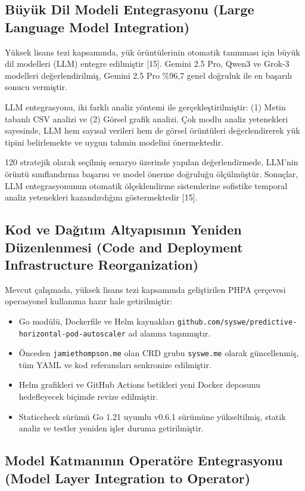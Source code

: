 \documentclass[12pt,a4paper]{article}
\begin{document}
\subsection{Büyük Dil Modeli Entegrasyonu (Large Language Model Integration)}

Yüksek lisans tezi kapsamında, yük örüntülerinin otomatik tanınması için büyük dil modelleri (LLM) entegre edilmiştir [15]. Gemini 2.5 Pro, Qwen3 ve Grok-3 modelleri değerlendirilmiş, Gemini 2.5 Pro \%96,7 genel doğruluk ile en başarılı sonucu vermiştir.

LLM entegrasyonu, iki farklı analiz yöntemi ile gerçekleştirilmiştir: (1) Metin tabanlı CSV analizi ve (2) Görsel grafik analizi. Çok modlu analiz yetenekleri sayesinde, LLM hem sayısal verileri hem de görsel örüntüleri değerlendirerek yük tipini belirlemekte ve uygun tahmin modelini önermektedir.

120 stratejik olarak seçilmiş senaryo üzerinde yapılan değerlendirmede, LLM'nin örüntü sınıflandırma başarısı ve model önerme doğruluğu ölçülmüştür. Sonuçlar, LLM entegrasyonunun otomatik ölçeklendirme sistemlerine sofistike temporal analiz yetenekleri kazandırdığını göstermektedir [15].

\subsection{Kod ve Dağıtım Altyapısının Yeniden Düzenlenmesi (Code and Deployment Infrastructure Reorganization)}

Mevcut çalışmada, yüksek lisans tezi kapsamında geliştirilen PHPA çerçevesi operasyonel kullanıma hazır hale getirilmiştir:

\begin{itemize}[noitemsep]
  \item Go modülü, Dockerfile ve Helm kaynakları \texttt{github.com/syswe/predictive-horizontal-pod-autoscaler} ad alanına taşınmıştır.
  \item Önceden \texttt{jamiethompson.me} olan CRD grubu \texttt{syswe.me} olarak güncellenmiş, tüm YAML ve kod referansları senkronize edilmiştir.
  \item Helm grafikleri ve GitHub Actions betikleri yeni Docker deposunu hedefleyecek biçimde revize edilmiştir.
  \item Staticcheck sürümü Go 1.21 uyumlu v0.6.1 sürümüne yükseltilmiş, statik analiz ve testler yeniden işler duruma getirilmiştir.
\end{itemize}

\subsection{Model Katmanının Operatöre Entegrasyonu (Model Layer Integration to Operator)}
\end{document}

